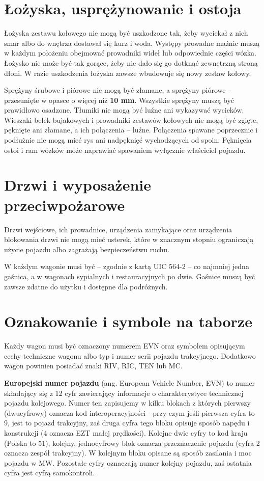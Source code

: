 \section{Łożyska, usprężynowanie i ostoja}

Łożyska zestawu kołowego nie mogą być uszkodzone tak, żeby wyciekał z nich smar albo do wnętrza dostawał się kurz i woda. Występy prowadne maźnic muszą w każdym położeniu obejmować prowadniki wideł lub odpowiednie części wózka. Łożysko nie może być tak gorące, żeby nie dało się go dotknąć zewnętrzną stroną dłoni. W razie uszkodzenia łożyska zawsze wbudowuje się nowy zestaw kołowy.

Sprężyny śrubowe i piórowe nie mogą być złamane, a sprężyny piórowe – przesunięte w opasce o więcej niż \textbf{10 mm}. Wszystkie sprężyny muszą być prawidłowo osadzone. Tłumiki nie mogą być luźne ani wykazywać wycieków. Wieszaki belek bujakowych i prowadniki zestawów kołowych nie mogą być zgięte, pęknięte ani złamane, a ich połączenia – luźne. Połączenia spawane poprzecznic i podłużnic nie mogą mieć rys ani nadpęknięć wychodzących od spoin. Pęknięcia ostoi i ram wózków może naprawiać spawaniem wyłącznie właściciel pojazdu.

\section{Drzwi i wyposażenie przeciwpożarowe}

Drzwi wejściowe, ich prowadnice, urządzenia zamykające oraz urządzenia blokowania drzwi nie mogą mieć usterek, które w znacznym stopniu ograniczają użycie pojazdu albo zagrażają bezpieczeństwu ruchu.

W każdym wagonie musi być – zgodnie z kartą UIC 564-2 – co najmniej jedna gaśnica, a w wagonach sypialnych i restauracyjnych po dwie. Gaśnice muszą być zawsze zdatne do użytku i dostępne dla podróżnych.

\section{Oznakowanie i symbole na taborze}

Każdy wagon musi być oznaczony numerem EVN oraz symbolem opisującym cechy techniczne wagonu albo typ i numer serii pojazdu trakcyjnego. Dodatkowo wagon powinien posiadać znaki RIV, RIC, TEN lub MC.

\textbf{Europejski numer pojazdu} (ang. European Vehicle Number, EVN) to numer składający się z 12 cyfr zawierający informacje o charakterystyce technicznej pojazdu kolejowego. 
Numer ten zapisujemy w kilku blokach z których pierwszy (dwucyfrowy) oznacza kod interoperacyjności - przy czym jeśli pierwsza cyfra to 9, jest to pojazd trakcyjny, zaś druga cyfra tego bloku opisuje sposób napędu i konstrukcji (4 oznacza EZT małej prędkości). Kolejne dwie cyfry to kod kraju (Polska to 51), kolejny, jednocyfrowy blok oznacza przeznaczenie pojazdu (cyfra 2 oznacza zespół trakcyjny). W kolejnym bloku opisane są sposób zasilania i moc pojazdu w MW. Pozostałe cyfry oznaczają numer kolejny pojazdu, zaś ostatnia cyfra jest cyfrą samokontroli.

